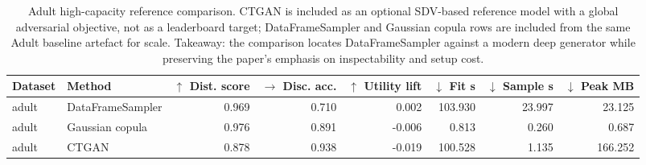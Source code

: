 \begin{table}
\caption{Adult high-capacity reference comparison. CTGAN is included as an optional SDV-based reference model with a global adversarial objective, not as a leaderboard target; DataFrameSampler and Gaussian copula rows are included from the same Adult baseline artefact for scale. Takeaway: the comparison locates DataFrameSampler against a modern deep generator while preserving the paper's emphasis on inspectability and setup cost.}
\label{tab:deep-reference-comparison}
\begin{adjustbox}{max width=\textwidth}
\begin{tabular}{llrrrrrr}
\toprule
Dataset & Method & $\uparrow$ Dist. score & $\rightarrow$ Disc. acc. & $\uparrow$ Utility lift & $\downarrow$ Fit s & $\downarrow$ Sample s & $\downarrow$ Peak MB \\
\midrule
adult & DataFrameSampler & 0.969 & 0.710 & 0.002 & 103.930 & 23.997 & 23.125 \\
adult & Gaussian copula & 0.976 & 0.891 & -0.006 & 0.813 & 0.260 & 0.687 \\
adult & CTGAN & 0.878 & 0.938 & -0.019 & 100.528 & 1.135 & 166.252 \\
\bottomrule
\end{tabular}
\end{adjustbox}
\end{table}
